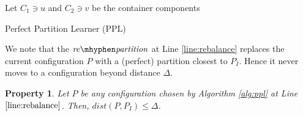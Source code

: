 \documentclass[manuscript,screen=true]{acmart}
\newtheorem{property}{Property}
\DeclarePairedDelimiter\set{\{}{\}}
\newcommand\maciek[1]{\color{brown}\textbf{\\ Maciek: #1}\color{black}}
\begin{document}
\begin{algorithm}
    \renewcommand{\algorithmicrequire}{\textbf{Input:}}
    \renewcommand{\algorithmicensure}{\textbf{Output:}}
    \begin{algorithmic}
         \label{line:initcomponents}
        \STATE Let $C_1 \ni u$ and $C_2 \ni v$ be the container components
         \label{line:mergecomponents}
        \label{line:rebalance} 
        \ENDIF
        \ENDIF
        \ENDFOR
    \end{algorithmic}
    \caption{Perfect Partition Learner (PPL)}
    \label{alg:ppl}
      \end{algorithm}
  
      We note that the $\mathit{re\mhyphen partition}$ at Line \ref{line:rebalance} replaces the current configuration $P$ with a (perfect) partition closest to $P_I$.
Hence it never moves to a configuration beyond distance $\Delta$.      
\begin{property} \label{prop:dist<OPT}
    Let $P$ be any configuration chosen by Algorithm \ref{alg:ppl} at Line $\ref{line:rebalance}$.
    Then, $\mathit{dist}(P,P_I) \leq \Delta$.
\end{property}
\end{document}
